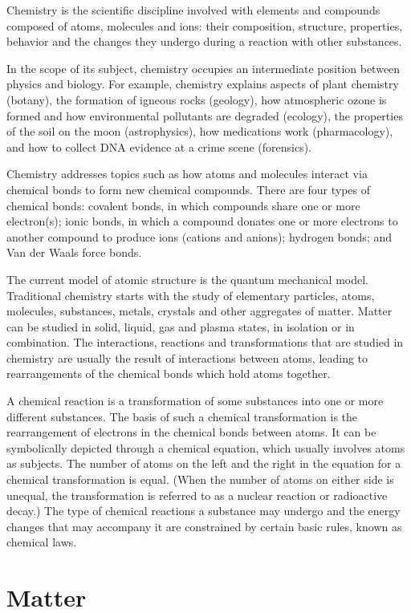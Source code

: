 \documentclass[
]{book}
\begin{document}
Chemistry is the scientific discipline involved with elements and compounds composed of atoms, molecules and ions: their composition, structure, properties, behavior and the changes they undergo during a reaction with other substances.

In the scope of its subject, chemistry occupies an intermediate position between physics and biology. For example, chemistry explains aspects of plant chemistry (botany), the formation of igneous rocks (geology), how atmospheric ozone is formed and how environmental pollutants are degraded (ecology), the properties of the soil on the moon (astrophysics), how medications work (pharmacology), and how to collect DNA evidence at a crime scene (forensics).

Chemistry addresses topics such as how atoms and molecules interact via chemical bonds to form new chemical compounds. There are four types of chemical bonds: covalent bonds, in which compounds share one or more electron(s); ionic bonds, in which a compound donates one or more electrons to another compound to produce ions (cations and anions); hydrogen bonds; and Van der Waals force bonds.

The current model of atomic structure is the quantum mechanical model. Traditional chemistry starts with the study of elementary particles, atoms, molecules, substances, metals, crystals and other aggregates of matter. Matter can be studied in solid, liquid, gas and plasma states, in isolation or in combination. The interactions, reactions and transformations that are studied in chemistry are usually the result of interactions between atoms, leading to rearrangements of the chemical bonds which hold atoms together.

A chemical reaction is a transformation of some substances into one or more different substances. The basis of such a chemical transformation is the rearrangement of electrons in the chemical bonds between atoms. It can be symbolically depicted through a chemical equation, which usually involves atoms as subjects. The number of atoms on the left and the right in the equation for a chemical transformation is equal. (When the number of atoms on either side is unequal, the transformation is referred to as a nuclear reaction or radioactive decay.) The type of chemical reactions a substance may undergo and the energy changes that may accompany it are constrained by certain basic rules, known as chemical laws.

\hypertarget{matter}{%
\section{Matter}\label{matter}}
\end{document}
